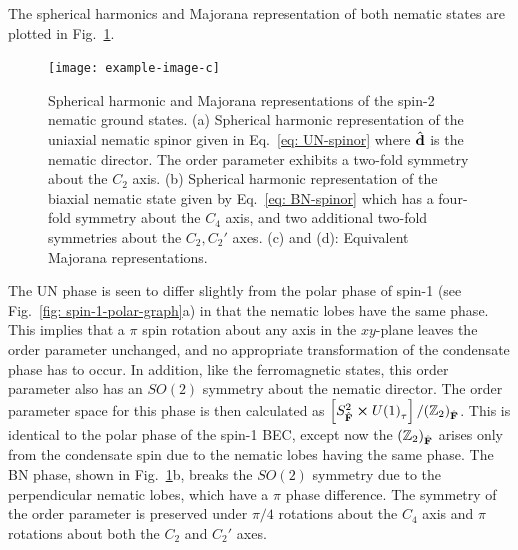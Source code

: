 The spherical harmonics and Majorana representation of both nematic states are
plotted in Fig.~\ref{fig: nematic-graph}.
\begin{figure}
    \centering
    \texttt{[image: example-image-c]}
    \caption[Spherical harmonic and Majorana representations of the spin-2
    nematic ground states]{\label{fig: nematic-graph}Spherical harmonic and
    Majorana representations of the spin-2 nematic ground states.
    (a) Spherical harmonic representation of the uniaxial nematic spinor given
    in Eq.~\eqref{eq: UN-spinor} where \(\hat{\vb{d}}\) is the nematic director.
    The order parameter exhibits a two-fold symmetry about the \(C_2\) axis.
    (b) Spherical harmonic representation of the biaxial nematic state given by
    Eq.~\eqref{eq: BN-spinor} which has a four-fold symmetry about the \(C_4\)
    axis, and two additional two-fold symmetries about the \(C_2, C_2'\) axes.
    (c) and (d): Equivalent Majorana representations.}
\end{figure}
The UN phase is seen to differ slightly from the polar phase of spin-1 (see
Fig.~\ref{fig: spin-1-polar-graph}a) in that the nematic lobes have the
same phase.
This implies that a \(\pi \) spin rotation about any axis in the \(xy\)-plane
leaves the order parameter unchanged, and no appropriate transformation of the
condensate phase has to occur.
In addition, like the ferromagnetic states, this order parameter also has an
\(SO(2)\) symmetry about the nematic director.
The order parameter space for this phase is then calculated as
\(\left[S^2_{\hat{\vb{F}}} \cross {U(1)}_\tau\right]
/ {({\mathbb{Z}}_2)}_{\hat{\vb{F}}} \).
This is identical to the polar phase of the spin-1 BEC, except now the
\({(\mathbb{Z}_2)}_{\hat{\vb{F}}}\) arises only from the condensate spin due to
the nematic lobes having the same phase.
The BN phase, shown in Fig.~\ref{fig: nematic-graph}b, breaks the
\(SO(2)\) symmetry due to the perpendicular nematic lobes, which have a \(\pi \)
phase difference.
The symmetry of the order parameter is preserved under \(\pi/4\) rotations
about the \(C_4\) axis and \(\pi\) rotations about both the \(C_2\) and \(C_2'\)
axes.


